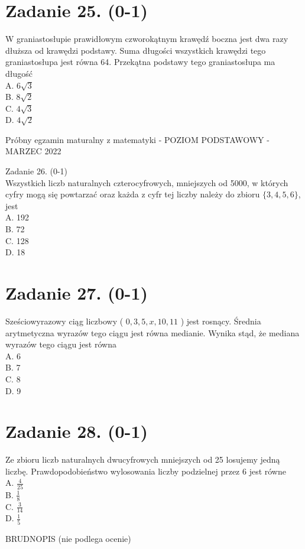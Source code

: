 \documentclass[10pt]{article}
\begin{document}
\section*{Zadanie 25. (0-1)}
W graniastosłupie prawidłowym czworokątnym krawędź boczna jest dwa razy dłuższa od krawędzi podstawy. Suma długości wszystkich krawędzi tego graniastosłupa jest równa 64. Przekątna podstawy tego graniastosłupa ma długość\\
A. \(6 \sqrt{3}\)\\
B. \(8 \sqrt{2}\)\\
C. \(4 \sqrt{3}\)\\
D. \(4 \sqrt{2}\)

Próbny egzamin maturalny z matematyki - POZIOM PODSTAWOWY - MARZEC 2022

Zadanie 26. (0-1)\\
Wszystkich liczb naturalnych czterocyfrowych, mniejszych od 5000, w których cyfry mogą się powtarzać oraz każda z cyfr tej liczby należy do zbioru \(\{3,4,5,6\}\), jest\\
A. 192\\
B. 72\\
C. 128\\
D. 18

\section*{Zadanie 27. (0-1)}
Sześciowyrazowy ciąg liczbowy ( \(0,3,5, x, 10,11\) ) jest rosnący. Średnia arytmetyczna wyrazów tego ciągu jest równa medianie. Wynika stąd, że mediana wyrazów tego ciągu jest równa\\
A. 6\\
B. 7\\
C. 8\\
D. 9

\section*{Zadanie 28. (0-1)}
Ze zbioru liczb naturalnych dwucyfrowych mniejszych od 25 losujemy jedną liczbę. Prawdopodobieństwo wylosowania liczby podzielnej przez 6 jest równe\\
A. \(\frac{4}{25}\)\\
B. \(\frac{1}{8}\)\\
C. \(\frac{3}{14}\)\\
D. \(\frac{1}{5}\)

BRUDNOPIS (nie podlega ocenie)
\end{document}
